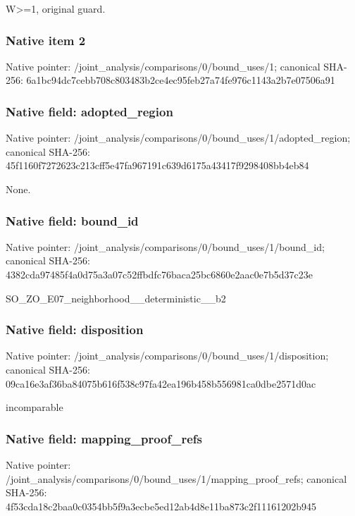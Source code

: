 \documentclass[10pt,a4paper]{article}
\begin{document}
\begingroup\raggedright\sloppy W>=\allowbreak{}1,\allowbreak{} original guard.\par\endgroup

\subsubsection{Native item 2}
Native pointer: /joint\_\allowbreak{}analysis/comparisons/0/bound\_\allowbreak{}uses/1; canonical SHA-256: 6a1bc94dc7cebb708c803483b2ce4ec95feb27a74fe976c1143a2b7e07506a91

\subsubsection{Native field: adopted\_\allowbreak{}region}
Native pointer: /joint\_\allowbreak{}analysis/comparisons/0/bound\_\allowbreak{}uses/1/adopted\_\allowbreak{}region; canonical SHA-256: 45f1160f7272623c213cff5e47fa967191c639d6175a43417f9298408bb4eb84

\begingroup\raggedright\sloppy None.\par\endgroup

\subsubsection{Native field: bound\_\allowbreak{}id}
Native pointer: /joint\_\allowbreak{}analysis/comparisons/0/bound\_\allowbreak{}uses/1/bound\_\allowbreak{}id; canonical SHA-256: 4382cda97485f4a0d75a3a07c52ffbdfc76baca25bc6860e2aac0e7b5d37c23e

\begingroup\raggedright\sloppy SO\_\allowbreak{}ZO\_\allowbreak{}E07\_\allowbreak{}neighborhood\_\allowbreak{}\_\allowbreak{}deterministic\_\allowbreak{}\_\allowbreak{}b2\par\endgroup

\subsubsection{Native field: disposition}
Native pointer: /joint\_\allowbreak{}analysis/comparisons/0/bound\_\allowbreak{}uses/1/disposition; canonical SHA-256: 09ca16e3af36ba84075b616f538c97fa42ea196b458b556981ca0dbe2571d0ac

\begingroup\raggedright\sloppy incomparable\par\endgroup

\subsubsection{Native field: mapping\_\allowbreak{}proof\_\allowbreak{}refs}
Native pointer: /joint\_\allowbreak{}analysis/comparisons/0/bound\_\allowbreak{}uses/1/mapping\_\allowbreak{}proof\_\allowbreak{}refs; canonical SHA-256: 4f53cda18c2baa0c0354bb5f9a3ecbe5ed12ab4d8e11ba873c2f11161202b945
\end{document}
